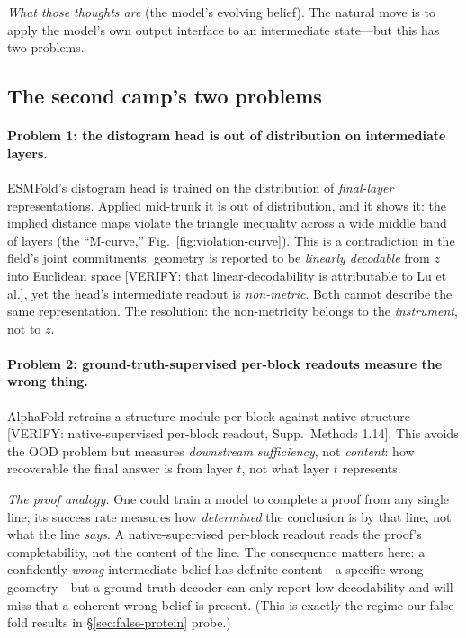\documentclass[11pt]{article}
\newcommand{\VERIFY}[1]{{\color{red}\small\textsf{[VERIFY: #1]}}}
\begin{document}
\emph{What those thoughts are} (the model's evolving belief). The natural move is
to apply the model's own output interface to an intermediate state---but this has
two problems.

\subsection{The second camp's two problems}
\label{sec:two-problems}

\paragraph{Problem 1: the distogram head is out of distribution on intermediate
layers.}
ESMFold's distogram head is trained on the distribution of \emph{final-layer}
representations. Applied mid-trunk it is out of distribution, and it shows it:
the implied distance maps violate the triangle inequality across a wide middle
band of layers (the ``M-curve,'' Fig.~\ref{fig:violation-curve}). This is a
contradiction in the field's joint commitments: geometry is reported to be
\emph{linearly decodable} from $z$ into Euclidean space \citep{lu2026phase}
\VERIFY{that linear-decodability is attributable to Lu et al.}, yet the head's
intermediate readout is \emph{non-metric}. Both cannot describe the same
representation. The resolution: the non-metricity belongs to the
\emph{instrument}, not to $z$.

\paragraph{Problem 2: ground-truth-supervised per-block readouts measure the
wrong thing.}
AlphaFold retrains a structure module per block against native structure
\citep{alphafold2} \VERIFY{native-supervised per-block readout, Supp.\ Methods
1.14}. This avoids the OOD problem but measures \emph{downstream sufficiency},
not \emph{content}: how recoverable the final answer is from layer $t$, not what
layer $t$ represents.

\emph{The proof analogy.} One could train a model to complete a proof from any
single line; its success rate measures how \emph{determined} the conclusion is by
that line, not what the line \emph{says}. A native-supervised per-block readout
reads the proof's completability, not the content of the line. The consequence
matters here: a confidently \emph{wrong} intermediate belief has definite
content---a specific wrong geometry---but a ground-truth decoder can only report
low decodability and will miss that a coherent wrong belief is present. (This is
exactly the regime our false-fold results in \S\ref{sec:false-protein} probe.)
\end{document}
